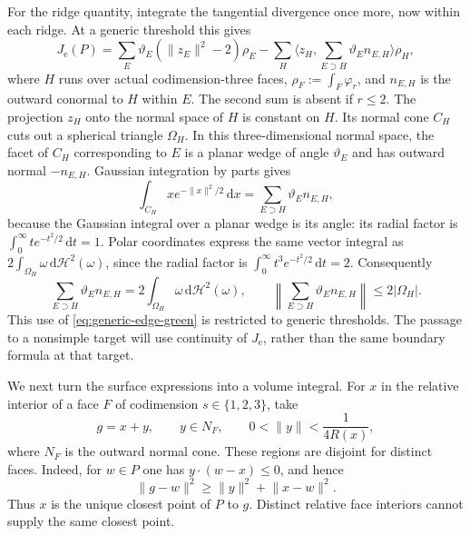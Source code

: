 \documentclass[11pt]{article}
\newcommand{\dd}{\,\mathrm d}
\newcommand{\ip}[2]{\langle #1,#2\rangle}
\newcommand{\norm}[1]{\lVert #1\rVert}
\newcommand{\Je}{J_{\mathrm e}}
\newcommand{\HH}{\mathcal H}
\begin{document}
For the ridge quantity, integrate the tangential divergence once more,
now within each ridge. At a generic threshold this gives
\begin{equation}\label{eq:generic-edge-green}
 \Je(P)=\sum_E\vartheta_E(\norm{z_E}^2-2)\rho_E
 -\sum_H\ip{z_H}{\sum_{E\supset H}\vartheta_E n_{E,H}}\rho_H,
\end{equation}
where $H$ runs over actual codimension-three faces,
$\rho_F:=\int_F\varphi_r$, and $n_{E,H}$ is the outward conormal to
$H$ within $E$. The second sum is absent if $r\le2$.
The projection $z_H$ onto the normal space of $H$ is constant on $H$.
Its normal cone $C_H$ cuts out a spherical triangle $\Omega_H$.
In this three-dimensional normal space, the facet of $C_H$
corresponding to $E$ is a planar wedge of angle $\vartheta_E$ and has
outward normal $-n_{E,H}$. Gaussian integration by parts gives
\[
 \int_{C_H}x e^{-\norm x^2/2}\dd x
 =\sum_{E\supset H}\vartheta_E n_{E,H},
\]
because the Gaussian integral over a planar wedge is its angle:
its radial factor is $\int_0^\infty t e^{-t^2/2}\dd t=1$.
Polar coordinates express the same vector integral as
$2\int_{\Omega_H}\omega\dd\HH^2(\omega)$, since the radial factor is
$\int_0^\infty t^3e^{-t^2/2}\dd t=2$. Consequently
\[
 \sum_{E\supset H}\vartheta_E n_{E,H}
 =2\int_{\Omega_H}\omega\dd\HH^2(\omega),
 \qquad
 \left\|\sum_{E\supset H}\vartheta_E n_{E,H}\right\|
 \le2|\Omega_H|.
\]
This use of \eqref{eq:generic-edge-green} is restricted to generic
thresholds. The passage to a nonsimple target will use continuity of
$\Je$, rather than the same boundary formula at that target.

We next turn the surface expressions into a volume integral. For
$x$ in the relative interior of a face $F$ of codimension
$s\in\{1,2,3\}$, take
\[
 g=x+y,\qquad y\in N_F,\qquad
          0<\norm y<\frac1{4R(x)},
\]
where $N_F$ is the outward normal cone. These regions are disjoint
for distinct faces. Indeed, for $w\in P$ one has
$y\cdot(w-x)\le0$, and hence
\[
 \norm{g-w}^2\ge\norm y^2+\norm{x-w}^2.
\]
Thus $x$ is the unique closest point of $P$ to $g$. Distinct relative
face interiors cannot supply the same closest point.
\end{document}
